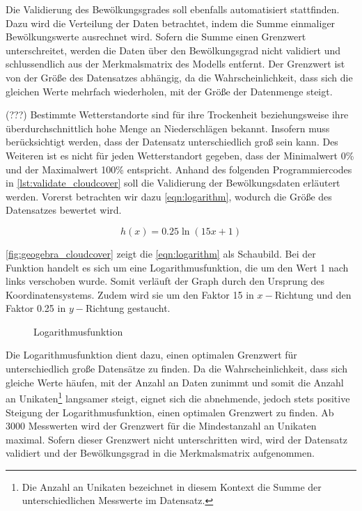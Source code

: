 \documentclass[12pt, a4paper]{article}
\begin{document}
Die Validierung des Bewölkungsgrades soll ebenfalls automatisiert stattfinden. Dazu wird die Verteilung der Daten betrachtet, indem die Summe einmaliger Bewölkungswerte ausrechnet wird. Sofern die Summe einen Grenzwert unterschreitet, werden die Daten über den Bewölkungsgrad nicht validiert und schlussendlich aus der Merkmalsmatrix des Modells entfernt. Der Grenzwert ist von der Größe des Datensatzes abhängig, da die Wahrscheinlichkeit, dass sich die gleichen Werte mehrfach wiederholen, mit der Größe der Datenmenge steigt. 

(???)
Bestimmte Wetterstandorte sind für ihre Trockenheit beziehungsweise ihre überdurchschnittlich hohe Menge an Niederschlägen bekannt. Insofern muss berücksichtigt werden, dass der Datensatz unterschiedlich groß sein kann. Des Weiteren ist es nicht für jeden Wetterstandort gegeben, dass der Minimalwert 0\% und der Maximalwert 100\% entspricht. Anhand des folgenden Programmiercodes in \autoref{lst:validate_cloudcover} soll die Validierung der Bewölkungsdaten erläutert werden. Vorerst betrachten wir dazu \autoref{eqn:logarithm}, wodurch die Größe des Datensatzes bewertet wird.

\begin{equation}
\label{eqn:logarithm}
h(x)=0.25\ln(15x+1)
\end{equation}

\autoref{fig:geogebra_cloudcover} zeigt die \autoref{eqn:logarithm} als Schaubild. Bei der Funktion handelt es sich um eine Logarithmusfunktion, die um den Wert 1 nach links verschoben wurde. Somit verläuft der Graph durch den Ursprung des Koordinatensystems. Zudem wird sie um den Faktor 15 in $x-$Richtung und den Faktor 0.25 in $y-$Richtung gestaucht.

\begin{figure}[h]
\centering
\def\svgwidth{425pt}

\caption{Logarithmusfunktion}
\label{fig:geogebra_cloudcover}
\end {figure}

Die Logarithmusfunktion dient dazu, einen optimalen Grenzwert für unterschiedlich große Datensätze zu finden. Da die Wahrscheinlichkeit, dass sich gleiche Werte häufen, mit der Anzahl an Daten zunimmt und somit die Anzahl an Unikaten\footnote{Die Anzahl an Unikaten bezeichnet in diesem Kontext die Summe der unterschiedlichen Messwerte im Datensatz.} langsamer steigt, eignet sich die abnehmende, jedoch stets positive Steigung der Logarithmusfunktion, einen optimalen Grenzwert zu finden. Ab 3000 Messwerten wird der Grenzwert für die Mindestanzahl an Unikaten maximal. Sofern dieser Grenzwert nicht unterschritten wird, wird der Datensatz validiert und der Bewölkungsgrad in die Merkmalsmatrix aufgenommen. 
\end{document}
